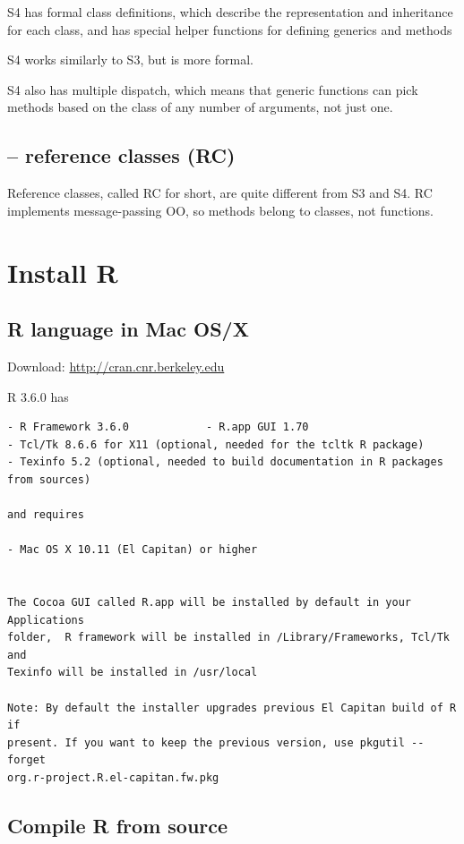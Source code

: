 S4 has formal class definitions, which describe the representation and
inheritance for each class, and has special helper functions for defining
generics and methods

S4 works similarly to S3, but is more formal.

S4 also has multiple dispatch, which means that generic functions can pick
methods based on the class of any number of arguments, not just one.


\subsection{-- reference classes (RC)}
\label{sec:reference-classes}

Reference classes, called RC for short, are quite different from S3 and S4. RC
implements message-passing OO, so methods belong to classes, not functions.

\section{Install R}
\label{sec:R-install}

\subsection{R language in Mac OS/X}
\label{sec:R-install-Mac}

Download: \url{http://cran.cnr.berkeley.edu}


R 3.6.0 has 
\begin{verbatim}
- R Framework 3.6.0            - R.app GUI 1.70
- Tcl/Tk 8.6.6 for X11 (optional, needed for the tcltk R package)
- Texinfo 5.2 (optional, needed to build documentation in R packages from sources)

and requires

- Mac OS X 10.11 (El Capitan) or higher


The Cocoa GUI called R.app will be installed by default in your Applications
folder,  R framework will be installed in /Library/Frameworks, Tcl/Tk and
Texinfo will be installed in /usr/local

Note: By default the installer upgrades previous El Capitan build of R if
present. If you want to keep the previous version, use pkgutil --forget
org.r-project.R.el-capitan.fw.pkg

\end{verbatim}



\subsection{Compile R from source}
\label{sec:R-compile}

